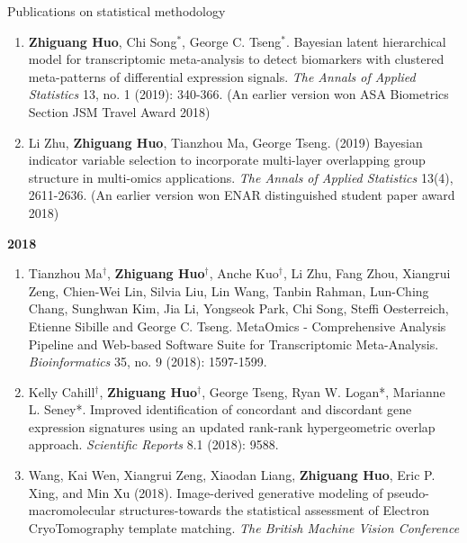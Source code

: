 \documentclass{resume} %
\begin{document}
\begin{rSection}{Publications on statistical methodology}
\begin{enumerate}[noitemsep,topsep=0pt,resume]
\item 
{\bf Zhiguang Huo}, Chi Song$^*$, George C. Tseng$^*$. 
Bayesian latent hierarchical model for transcriptomic meta-analysis to detect biomarkers with clustered meta-patterns of differential expression signals. \emph{The Annals of Applied Statistics} 13, no. 1 (2019): 340-366. (An earlier version won ASA Biometrics Section JSM Travel Award 2018)


\label{genstat_11} 
\label{soft_5} 


\item Li Zhu, {\bf  Zhiguang Huo}, Tianzhou Ma, George Tseng. (2019)
Bayesian indicator variable selection to incorporate multi-layer overlapping group structure in multi-omics applications. 
\emph{The Annals of Applied Statistics} 13(4), 2611-2636. 
(An earlier version won ENAR distinguished student paper award 2018)

\label{mlmethod_6}
\label{genstat_10} 

\end{enumerate}


\textbf{2018}
\begin{enumerate}[noitemsep,topsep=0pt, resume]

\item Tianzhou Ma$^\dagger$, {\bf  Zhiguang Huo$^\dagger$}, Anche Kuo$^\dagger$, Li Zhu, Fang Zhou, Xiangrui Zeng, Chien-Wei Lin, Silvia Liu, Lin Wang, Tanbin Rahman, Lun-Ching Chang, Sunghwan Kim, Jia Li, Yongseok Park, Chi Song, Steffi Oesterreich, Etienne Sibille and George C. Tseng. 
MetaOmics - Comprehensive Analysis Pipeline and Web-based Software Suite for Transcriptomic Meta-Analysis. \emph{Bioinformatics} 35, no. 9 (2018): 1597-1599. 

\label{genstat_9} 
\label{shiny_2} 


\item Kelly Cahill$^\dagger$, {\bf  Zhiguang Huo$^\dagger$}, George Tseng, Ryan W. Logan*, Marianne L. Seney*.
Improved identification of concordant and discordant gene expression signatures using an updated rank-rank hypergeometric overlap approach. \emph{Scientific Reports} 8.1 (2018): 9588.

\label{genstat_8} 
\label{soft_4} 


\item 
Wang, Kai Wen, Xiangrui Zeng, Xiaodan Liang, {\bf Zhiguang Huo}, Eric P. Xing, and Min Xu (2018). Image-derived generative modeling of pseudo-macromolecular structures-towards the statistical assessment of Electron CryoTomography template matching. \emph{The British Machine Vision Conference}


\end{enumerate}
\end{rSection}
\end{document}

